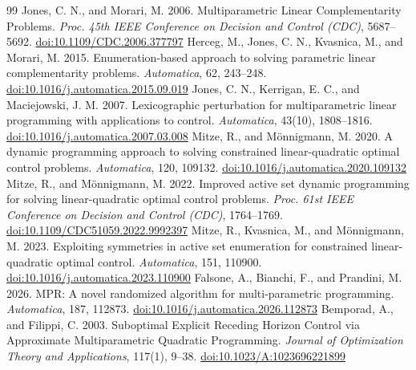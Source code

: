 \begin{thebibliography}{99}
 Jones, C. N., and Morari, M. 2006. Multiparametric Linear Complementarity Problems. \emph{Proc. 45th IEEE Conference on Decision and Control (CDC)}, 5687--5692. \href{https://login.ezproxy.lib.purdue.edu/login?url=https://doi.org/10.1109/CDC.2006.377797}{doi:10.1109/CDC.2006.377797}
 Herceg, M., Jones, C. N., Kvasnica, M., and Morari, M. 2015. Enumeration-based approach to solving parametric linear complementarity problems. \emph{Automatica}, 62, 243--248. \href{https://login.ezproxy.lib.purdue.edu/login?url=https://doi.org/10.1016/j.automatica.2015.09.019}{doi:10.1016/j.automatica.2015.09.019}
 Jones, C. N., Kerrigan, E. C., and Maciejowski, J. M. 2007. Lexicographic perturbation for multiparametric linear programming with applications to control. \emph{Automatica}, 43(10), 1808--1816. \href{https://login.ezproxy.lib.purdue.edu/login?url=https://doi.org/10.1016/j.automatica.2007.03.008}{doi:10.1016/j.automatica.2007.03.008}
 Mitze, R., and M{\"o}nnigmann, M. 2020. A dynamic programming approach to solving constrained linear-quadratic optimal control problems. \emph{Automatica}, 120, 109132. \href{https://login.ezproxy.lib.purdue.edu/login?url=https://doi.org/10.1016/j.automatica.2020.109132}{doi:10.1016/j.automatica.2020.109132}
 Mitze, R., and M{\"o}nnigmann, M. 2022. Improved active set dynamic programming for solving linear-quadratic optimal control problems. \emph{Proc. 61st IEEE Conference on Decision and Control (CDC)}, 1764--1769. \href{https://login.ezproxy.lib.purdue.edu/login?url=https://doi.org/10.1109/CDC51059.2022.9992397}{doi:10.1109/CDC51059.2022.9992397}
 Mitze, R., Kvasnica, M., and M{\"o}nnigmann, M. 2023. Exploiting symmetries in active set enumeration for constrained linear-quadratic optimal control. \emph{Automatica}, 151, 110900. \href{https://login.ezproxy.lib.purdue.edu/login?url=https://doi.org/10.1016/j.automatica.2023.110900}{doi:10.1016/j.automatica.2023.110900}
 Falsone, A., Bianchi, F., and Prandini, M. 2026. {MPR}: A novel randomized algorithm for multi-parametric programming. \emph{Automatica}, 187, 112873. \href{https://login.ezproxy.lib.purdue.edu/login?url=https://doi.org/10.1016/j.automatica.2026.112873}{doi:10.1016/j.automatica.2026.112873}
 Bemporad, A., and Filippi, C. 2003. Suboptimal Explicit Receding Horizon Control via Approximate Multiparametric Quadratic Programming. \emph{Journal of Optimization Theory and Applications}, 117(1), 9--38. \href{https://login.ezproxy.lib.purdue.edu/login?url=https://doi.org/10.1023/A:1023696221899}{doi:10.1023/A:1023696221899}

\end{thebibliography}
